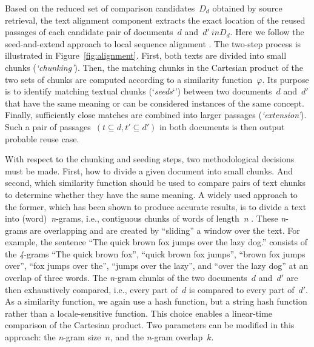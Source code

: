 Based on the reduced set of comparison candidates~$D_d$ obtained by source retrieval, the text alignment component extracts the exact location of the reused passages of each candidate pair of documents~$d$ and~$d'\ in D_d$. Here we follow the seed-and-extend approach to local sequence alignment \cite{potthast:2012b}. The two-step process is illustrated in Figure~\ref{fig:alignment}. First, both texts are divided into small chunks (\emph{`chunking'}). Then, the matching chunks in the Cartesian product of the two sets of chunks are computed according to a similarity function~$\varphi$. Its purpose is to identify matching textual chunks (`\textit{seeds}`') between two documents~$d$ and~$d'$ that have the same meaning or can be considered instances of the same concept. Finally, sufficiently close matches are combined into larger passages (\emph{`extension'}). Such a pair of passages~$(t \subseteq d, t' \subseteq d')$ in both documents is then output probable reuse case.

With respect to the chunking and seeding steps, two methodological decisions must be made. First, how to divide a given document into small chunks. And second, which similarity function should be used to compare pairs of text chunks to determine whether they have the same meaning. A widely used approach to the former, which has been shown to produce accurate results, is to divide a text into (word)~\emph{n}-grams, i.e., contiguous chunks of words of length~\emph{n} \cite{stamatatos:2011,citron:2015}. These \emph{n}-grams are overlapping and are created by ``sliding'' a window over the text. For example, the sentence ``The quick brown fox jumps over the lazy dog.'' consists of the \emph{4}-grams ``The quick brown fox'', ``quick brown fox jumps'', ``brown fox jumps over'', ``fox jumps over the'', ``jumps over the lazy'', and ``over the lazy dog'' at an overlap of three words. The  \emph{n}-gram chunks of the two documents~$d$ and~$d'$ are then exhaustively compared, i.e., every part of~$d$ is compared to every part of~$d'$. As a similarity function, we again use a hash function, but a string hash function rather than a locale-sensitive function. This choice enables a linear-time comparison of the Cartesian product. Two parameters can be modified in this approach: the \emph{n}-gram size~$n$, and the \emph{n}-gram overlap~$k$.


